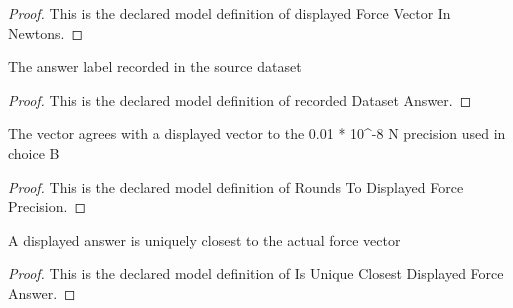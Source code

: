 \begin{proof}
  This is the declared model definition of displayed Force Vector In Newtons.
\end{proof}
\begin{definition}
  \label{def:physics:phyx-mini-0963:phyxminiproblems-problemphyxmini0963-recordeddatasetanswer}
  The answer label recorded in the source dataset
\end{definition}
\begin{proof}
  This is the declared model definition of recorded Dataset Answer.
\end{proof}
\begin{definition}
  \label{def:physics:phyx-mini-0963:phyxminiproblems-problemphyxmini0963-roundstodisplayedforceprecision}
  The vector agrees with a displayed vector to the 0.01 * 10\textasciicircum{}-8 N precision used in choice B
\end{definition}
\begin{proof}
  This is the declared model definition of Rounds To Displayed Force Precision.
\end{proof}
\begin{definition}
  \label{def:physics:phyx-mini-0963:phyxminiproblems-problemphyxmini0963-isuniqueclosestdisplayedforceanswer}
  A displayed answer is uniquely closest to the actual force vector
\end{definition}
\begin{proof}
  This is the declared model definition of Is Unique Closest Displayed Force Answer.
\end{proof}
